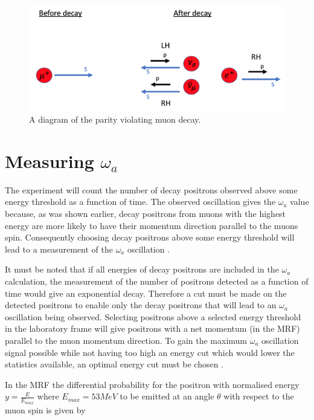 \begin{figure}[th]
\centering
\includegraphics[scale=0.6]{Figures/muondecay.png}
\decoRule
\caption{A diagram of the parity violating muon decay.}
\label{fig:muondecay}
\end{figure}

\section{Measuring $\omega_{a}$}

The experiment will count the number of decay positrons observed above some energy threshold as a function of time. The observed oscillation gives the $\omega_{a}$ value because, as was shown earlier, decay positrons from muons with the highest energy are more likely to have their momentum direction parallel to the muons spin. Consequently choosing decay positrons above some energy threshold will lead to a measurement of the $\omega_{a}$ oscillation \cite{Reference29}.

It must be noted that if all energies of decay positrons are included in the $\omega_{a}$ calculation, the measurement of the number of positrons detected as a function of time would give an exponential decay. Therefore a cut must be made on the detected positrons to enable only the decay positrons that will lead to an $\omega_{a}$ oscillation being observed. Selecting positrons above a selected energy threshold in the laboratory frame will give positrons with a net momentum (in the MRF) parallel to the muon momentum direction. To gain the maximum $\omega_{a}$ oscillation signal possible while not having too high an energy cut which would lower the statistics available, an optimal energy cut must be chosen \cite{Reference1}\cite{Reference13}.

In the MRF the differential probability for the positron with normalised energy $y=\frac{E}{E_{max}}$ where $E_{max}=53MeV$ to be emitted at an angle $\theta$ with respect to the muon spin is given by

